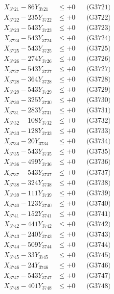 \documentclass[a4paper,10pt]{article}
\begin{document}
{\begin{align}
\allowbreak
X_{3721} - 86Y_{3721} &\leq +0 && \text{(G3721)} \\
X_{3722} - 235Y_{3722} &\leq +0 && \text{(G3722)} \\
X_{3723} - 543Y_{3723} &\leq +0 && \text{(G3723)} \\
X_{3724} - 543Y_{3724} &\leq +0 && \text{(G3724)} \\
X_{3725} - 543Y_{3725} &\leq +0 && \text{(G3725)} \\
X_{3726} - 274Y_{3726} &\leq +0 && \text{(G3726)} \\
X_{3727} - 543Y_{3727} &\leq +0 && \text{(G3727)} \\
X_{3728} - 364Y_{3728} &\leq +0 && \text{(G3728)} \\
X_{3729} - 543Y_{3729} &\leq +0 && \text{(G3729)} \\
X_{3730} - 325Y_{3730} &\leq +0 && \text{(G3730)} \\
\allowbreak
X_{3731} - 283Y_{3731} &\leq +0 && \text{(G3731)} \\
X_{3732} - 108Y_{3732} &\leq +0 && \text{(G3732)} \\
X_{3733} - 128Y_{3733} &\leq +0 && \text{(G3733)} \\
X_{3734} - 20Y_{3734} &\leq +0 && \text{(G3734)} \\
X_{3735} - 543Y_{3735} &\leq +0 && \text{(G3735)} \\
X_{3736} - 499Y_{3736} &\leq +0 && \text{(G3736)} \\
X_{3737} - 543Y_{3737} &\leq +0 && \text{(G3737)} \\
X_{3738} - 324Y_{3738} &\leq +0 && \text{(G3738)} \\
X_{3739} - 111Y_{3739} &\leq +0 && \text{(G3739)} \\
X_{3740} - 123Y_{3740} &\leq +0 && \text{(G3740)} \\
\allowbreak
X_{3741} - 152Y_{3741} &\leq +0 && \text{(G3741)} \\
X_{3742} - 441Y_{3742} &\leq +0 && \text{(G3742)} \\
X_{3743} - 240Y_{3743} &\leq +0 && \text{(G3743)} \\
X_{3744} - 509Y_{3744} &\leq +0 && \text{(G3744)} \\
X_{3745} - 33Y_{3745} &\leq +0 && \text{(G3745)} \\
X_{3746} - 24Y_{3746} &\leq +0 && \text{(G3746)} \\
X_{3747} - 543Y_{3747} &\leq +0 && \text{(G3747)} \\
X_{3748} - 401Y_{3748} &\leq +0 && \text{(G3748)} \\

\end{align}}
\end{document}
